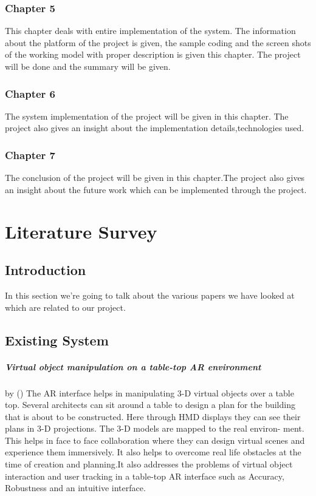 \documentclass[BTech]{srmuthesis}
\begin{document}
\subsection*{Chapter 5}
This chapter deals with entire implementation of the system. The information about the platform of the project is given, the sample coding and the screen shots of the working model with proper description is given this chapter. The project will be done and the summary will be given.
\subsection*{Chapter 6}
The system implementation of the project will be given in this chapter. The project also gives an insight
about the implementation details,technologies used.
\subsection*{Chapter 7}
The conclusion of the project will be given in this chapter.The project also gives an insight about the future work which can be implemented through the project.

\chapter{Literature Survey}
\section{Introduction}
In this section we're going to talk about the various papers we have looked at which are related to our project.
\section{Existing System}

\paragraph{Virtual object manipulation on a table-top AR environment} by (\cite{tabletop})
The AR interface helps in manipulating 3-D virtual objects
over a table top. Several architects can sit around a table to
design a plan for the building that is about to be constructed.
Here through HMD displays they can see their plans in 3-D
projections. The 3-D models are mapped to the real environ-
ment. This helps in face to face collaboration where they can
design virtual scenes and experience them immersively. It also
helps to overcome real life obstacles at the time of creation
and planning.It also addresses the problems of virtual object interaction and user tracking in a table-top AR interface such as Accuracy, Robustness and an intuitive interface.
\end{document}
